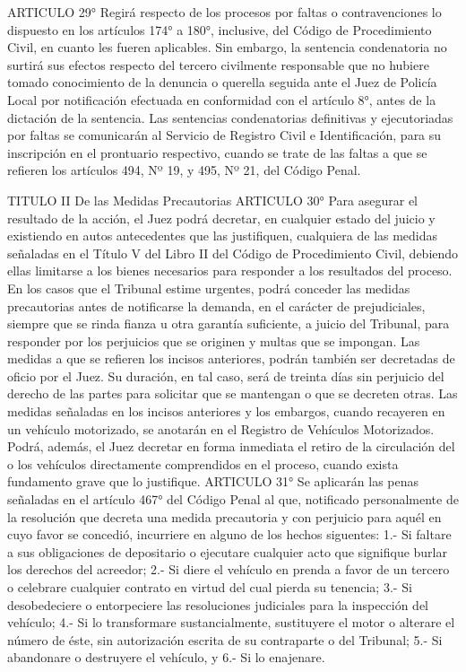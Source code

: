     ARTICULO 29° Regirá respecto de los procesos por faltas o contravenciones lo dispuesto en los artículos 174° a 180°, inclusive, del Código de Procedimiento Civil, en cuanto les fueren aplicables.
    Sin embargo, la sentencia condenatoria no surtirá sus efectos respecto del tercero civilmente responsable que no hubiere tomado conocimiento de la denuncia o querella seguida ante el Juez de Policía Local por notificación efectuada en conformidad con el artículo 8°, antes de la dictación de la sentencia.
    Las sentencias condenatorias definitivas y ejecutoriadas por faltas se comunicarán al Servicio de Registro Civil e Identificación, para su inscripción en el prontuario respectivo, cuando se trate de las faltas a que se refieren los artículos 494, Nº 19, y 495, Nº 21, del Código Penal.

    TITULO II
    De las Medidas Precautorias
    ARTICULO 30° Para asegurar el resultado de la acción, el Juez podrá decretar, en cualquier estado del juicio y existiendo en autos antecedentes que las justifiquen, cualquiera de las medidas señaladas en el Título V del Libro II del Código de Procedimiento Civil, debiendo ellas limitarse a los bienes necesarios para responder a los resultados del proceso.
    En los casos que el Tribunal estime urgentes, podrá conceder las medidas precautorias antes de notificarse la demanda, en el carácter de prejudiciales, siempre que se rinda fianza u otra garantía suficiente, a juicio del Tribunal, para responder por los perjuicios que se originen y multas que se impongan.
    Las medidas a que se refieren los incisos anteriores, podrán también ser decretadas de oficio por el Juez. Su duración, en tal caso, será de treinta días sin perjuicio del derecho de las partes para solicitar que se mantengan o que se decreten otras.
    Las medidas señaladas en los incisos anteriores y los embargos, cuando recayeren en un vehículo motorizado, se anotarán en el Registro de Vehículos Motorizados.
    Podrá, además, el Juez decretar en forma inmediata el retiro de la circulación del o los vehículos directamente comprendidos en el proceso, cuando exista fundamento grave que lo justifique.
    ARTICULO 31° Se aplicarán las penas señaladas en el artículo 467° del Código Penal al que, notificado personalmente de la resolución que decreta una medida precautoria y con perjuicio para aquél en cuyo favor se concedió, incurriere en alguno de los hechos siguentes:
    1.- Si faltare a sus obligaciones de depositario o ejecutare cualquier acto que signifique burlar los derechos del acreedor;
    2.- Si diere el vehículo en prenda a favor de un tercero o celebrare cualquier contrato en virtud del cual pierda su tenencia;
    3.- Si desobedeciere o entorpeciere las resoluciones judiciales para la inspección del vehículo;
    4.- Si lo transformare sustancialmente, sustituyere el motor o alterare el número de éste, sin autorización escrita de su contraparte o del Tribunal;
    5.- Si abandonare o destruyere el vehículo, y
    6.- Si lo enajenare.

